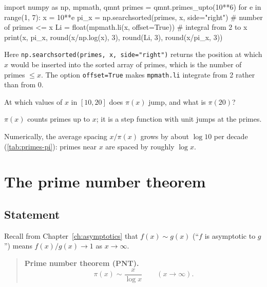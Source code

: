\begin{pycode}
import numpy as np, mpmath, qmnt
primes = qmnt.primes_upto(10**6)
for e in range(1, 7):
    x = 10**e
    pi_x = np.searchsorted(primes, x, side="right")   # number of primes <= x
    Li = float(mpmath.li(x, offset=True))              # integral from 2 to x
    print(x, pi_x, round(x/np.log(x), 3), round(Li, 3), round(x/pi_x, 3))
\end{pycode}

Here \texttt{np.searchsorted(primes, x, side="right")} returns the position at which $x$ would be inserted into the sorted array of primes, which is the number of primes $\le x$. The option \texttt{offset=True} makes \texttt{mpmath.li} integrate from 2 rather than from 0.

\begin{checkpoint}
At which values of $x$ in $[10,20]$ does $\pi(x)$ jump, and what is $\pi(20)$?
\end{checkpoint}

\begin{keyideas}
\item $\pi(x)$ counts primes up to $x$; it is a step function with unit jumps at the primes.
\item Numerically, the average spacing $x/\pi(x)$ grows by about $\log10$ per decade (\cref{tab:primes-pi}): primes near $x$ are spaced by roughly $\log x$.
\end{keyideas}

\section{The prime number theorem}\label{sec:primes-pnt}

\subsection{Statement}

Recall from Chapter~\ref{ch:asymptotics} that $f(x)\sim g(x)$ (``$f$ is asymptotic to $g$'') means $f(x)/g(x)\to1$ as $x\to\infty$.

\begin{quote}
\textbf{Prime number theorem (PNT).}
\begin{equation}
\pi(x)\sim\frac{x}{\log x}\qquad(x\to\infty).
\label{eq:primes-pnt}
\end{equation}
\end{quote}

